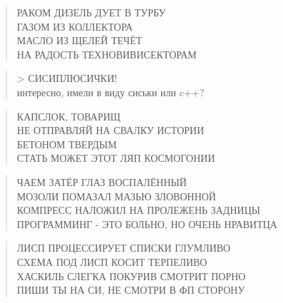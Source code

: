 \poemtitle{***}
\begin{verse}
РАКОМ ДИЗЕЛЬ ДУЕТ В ТУРБУ\\
ГАЗОМ ИЗ КОЛЛЕКТОРА\\
МАСЛО ИЗ ЩЕЛЕЙ ТЕЧЁТ\\
НА РАДОСТЬ ТЕХНОВИВИСЕКТОРАМ
\end{verse}

\poemtitle{***}
\begin{verse}
> СИСИПЛЮСИЧКИ!\\
интересно, имели в виду сиськи или c++?
\end{verse}

\poemtitle{***}
\begin{verse}
КАПСЛОК, ТОВАРИЩ\\
НЕ ОТПРАВЛЯЙ НА СВАЛКУ ИСТОРИИ\\
БЕТОНОМ ТВЕРДЫМ\\
СТАТЬ МОЖЕТ ЭТОТ ЛЯП КОСМОГОНИИ
\end{verse}

\poemtitle{***}
\begin{verse}
ЧАЕМ ЗАТЁР ГЛАЗ ВОСПАЛЁННЫЙ\\
МОЗОЛИ ПОМАЗАЛ МАЗЬЮ ЗЛОВОННОЙ\\
КОМПРЕСС НАЛОЖИЛ НА ПРОЛЕЖЕНЬ ЗАДНИЦЫ\\
ПРОГРАММИНГ - ЭТО БОЛЬНО, НО ОЧЕНЬ НРАВИТЦА
\end{verse}

\poemtitle{***}
\begin{verse}
ЛИСП ПРОЦЕССИРУЕТ СПИСКИ ГЛУМЛИВО\\
СХЕМА ПОД ЛИСП КОСИТ ТЕРПЕЛИВО\\
ХАСКИЛЬ СЛЕГКА ПОКУРИВ СМОТРИТ ПОРНО\\
ПИШИ ТЫ НА СИ, НЕ СМОТРИ В ФП СТОРОНУ
\end{verse}

